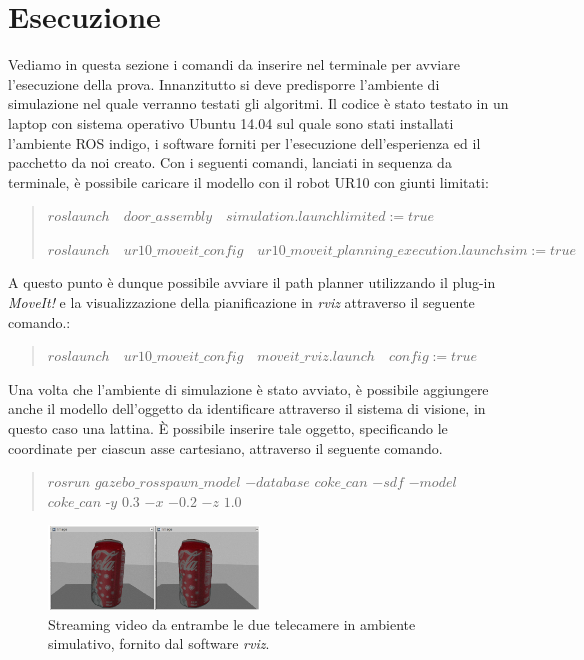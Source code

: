 \documentclass[english]{article}
\begin{document}
\section{Esecuzione}
Vediamo in questa sezione i comandi da inserire nel terminale per avviare l'esecuzione della prova. Innanzitutto si deve predisporre l'ambiente di simulazione nel quale verranno testati gli algoritmi. Il codice è stato testato in un laptop con sistema operativo Ubuntu 14.04 sul quale sono stati installati l'ambiente ROS indigo, i software forniti per l'esecuzione dell'esperienza ed il pacchetto da noi creato. Con i seguenti comandi, lanciati in sequenza da terminale, è possibile caricare il modello con il robot UR10 con giunti limitati:
\begin{verse}
\item $roslaunch \quad door\_assembly \quad simulation.launch limited:=true$
\item $roslaunch \quad ur10\_moveit\_config \quad ur10\_moveit\_planning\_execution.launch sim:=true$
\item 
\end{verse}
 A questo punto è dunque possibile avviare il path planner utilizzando il plug-in \textit{MoveIt!} e la visualizzazione della pianificazione in \textit{rviz} attraverso il seguente comando.:
\begin{verse}
\item $ roslaunch \quad ur10\_moveit\_config \quad moveit\_rviz.launch \quad config:=true $
\item 
\end{verse}
Una volta che l'ambiente di simulazione è stato avviato, è possibile aggiungere anche il modello dell'oggetto da identificare attraverso il sistema di visione, in questo caso una lattina. È possibile inserire tale oggetto, specificando le coordinate per ciascun asse cartesiano, attraverso il seguente comando. 
\begin{verse}
\item $rosrun$ $gazebo\_ros spawn\_model$ $-database$ $coke\_can$ $-sdf$  $-model$ $coke\_can$ -$y$ $0.3$ $-x$ $-0.2$ $-z$ $1.0 $
\item 
\end{verse}
\begin{figure}[!h]
\centering
\includegraphics[width=0.5\textwidth]{coke}
\caption{Streaming video da entrambe le due telecamere in ambiente simulativo, fornito dal software \textit{rviz}.}
\label{fig:coke}
\end{figure}
\end{document}

